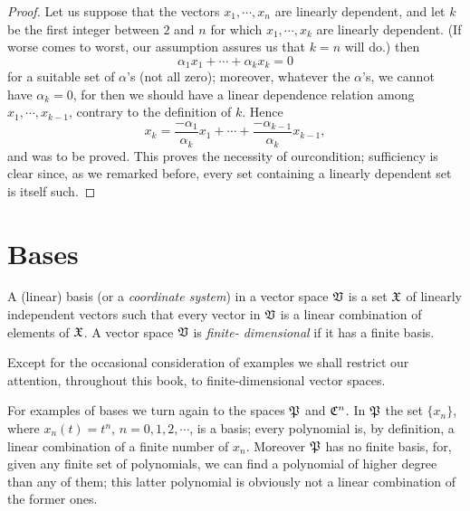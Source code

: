 \begin{proof}
    Let us suppose that the vectors \(x_1, \cdots, x_n\) are linearly dependent,
    and let \(k\) be the first integer between \(2\) and \(n\) for which \(x_1,
    \cdots, x_k\) are linearly dependent. (If worse comes to worst, our
    assumption assures us that \(k = n\) will do.) then
    \begin{equation*}
        \alpha_1 x_1 + \cdots + \alpha_k x_k = 0
    \end{equation*}
    for a suitable set of \(\alpha\)'s (not all zero); moreover, whatever the
    \(\alpha\)'s, we cannot have \(\alpha_k = 0\), for then we should have a
    linear dependence relation among \(x_1, \cdots, x_{k-1}\), contrary to the
    definition of \(k\). Hence
    \begin{equation*}
        x_k = \frac{-\alpha_1}{\alpha_k} x_1 + \cdots + \frac{-\alpha_{k-1}}{\alpha_k} x_{k-1},
    \end{equation*}
    and was to be proved. This proves the necessity of ourcondition; sufficiency
    is clear since, as we remarked before, every set containing a linearly
    dependent set is itself such.
\end{proof}


\section{Bases}

\begin{definition}
    A (linear) basis (or a \emph{coordinate system}) in a vector space
    \(  \frak{V}\) is a set \(\frak{X}\) of linearly independent vectors
    such that every vector in \(  \frak{V}\) is a linear combination of
    elements of \(\frak{X}\). A vector space \(  \frak{V}\) is \emph{finite-
    dimensional} if it has a finite basis.
\end{definition}

Except for the occasional consideration of examples we shall restrict our attention, throughout this book, to finite-dimensional vector spaces.

For examples of bases we turn again to the spaces \(\frak{P}\) and
\(\frak{C}^n\). In \(\frak{P}\) the set \(\{x_n\}\), where \(x_n(t) = t^n\), \(n
= 0, 1, 2, \cdots\), is a basis; every polynomial is, by definition, a linear
combination of a finite number of \(x_n\). Moreover \(\frak{P}\) has no finite
basis, for, given any finite set of polynomials, we can find a polynomial of
higher degree than any of them; this latter polynomial is obviously not a linear
combination of the former ones.

